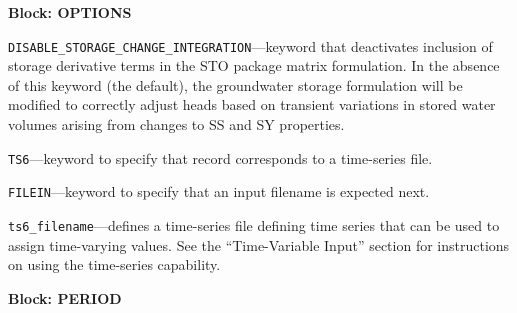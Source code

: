 
\item \textbf{Block: OPTIONS}

\begin{description}
\item \texttt{DISABLE\_STORAGE\_CHANGE\_INTEGRATION}---keyword that deactivates inclusion of storage derivative terms in the STO package matrix formulation.  In the absence of this keyword (the default), the groundwater storage formulation will be modified to correctly adjust heads based on transient variations in stored water volumes arising from changes to SS and SY properties.

\item \texttt{TS6}---keyword to specify that record corresponds to a time-series file.

\item \texttt{FILEIN}---keyword to specify that an input filename is expected next.

\item \texttt{ts6\_filename}---defines a time-series file defining time series that can be used to assign time-varying values. See the ``Time-Variable Input'' section for instructions on using the time-series capability.

\end{description}
\item \textbf{Block: PERIOD}

